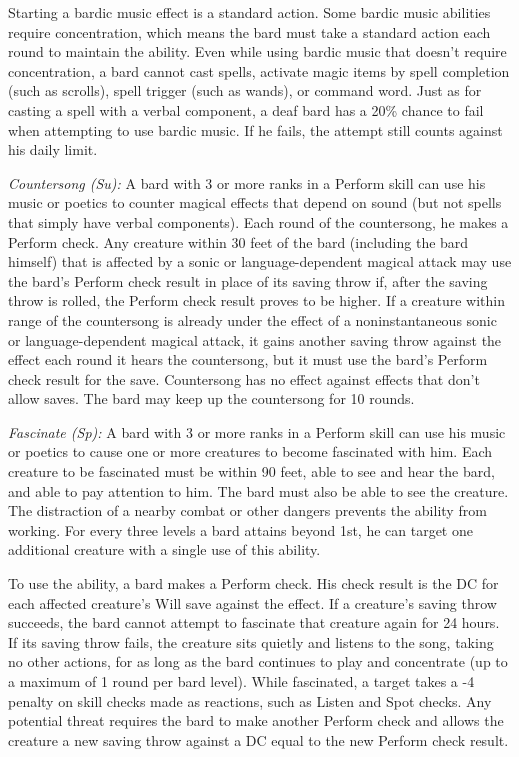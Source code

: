 \documentclass[10pt,a4paper,twocolumn]{d20}
\begin{document}
{Starting a bardic music effect is a standard action. Some bardic music abilities require concentration, which means the bard must take a standard action each round to maintain the ability. Even while using bardic music that doesn’t require concentration, a bard cannot cast spells, activate magic items by spell completion (such as scrolls), spell trigger (such as wands), or command word. Just as for casting a spell with a verbal component, a deaf bard has a 20\% chance to fail when attempting to use bardic music. If he fails, the attempt still counts against his daily limit.

\textit{Countersong (Su):} A bard with 3 or more ranks in a Perform skill can use his music or poetics to counter magical effects that depend on sound (but not spells that simply have verbal components). Each round of the countersong, he makes a Perform check. Any creature within 30 feet of the bard (including the bard himself) that is affected by a sonic or language-dependent magical attack may use the bard’s Perform check result in place of its saving throw if, after the saving throw is rolled, the Perform check result proves to be higher. If a creature within range of the countersong is already under the effect of a noninstantaneous sonic or language-dependent magical attack, it gains another saving throw against the effect each round it hears the countersong, but it must use the bard’s Perform check result for the save. Countersong has no effect against effects that don’t allow saves. The bard may keep up the countersong for 10 rounds.

\textit{Fascinate (Sp):} A bard with 3 or more ranks in a Perform skill can use his music or poetics to cause one or more creatures to become fascinated with him. Each creature to be fascinated must be within 90 feet, able to see and hear the bard, and able to pay attention to him. The bard must also be able to see the creature. The distraction of a nearby combat or other dangers prevents the ability from working. For every three levels a bard attains beyond 1st, he can target one additional creature with a single use of this ability.

To use the ability, a bard makes a Perform check. His check result is the DC for each affected creature’s Will save against the effect. If a creature’s saving throw succeeds, the bard cannot attempt to fascinate that creature again for 24 hours. If its saving throw fails, the creature sits quietly and listens to the song, taking no other actions, for as long as the bard continues to play and concentrate (up to a maximum of 1 round per bard level). While fascinated, a target takes a -4 penalty on skill checks made as reactions, such as Listen and Spot checks. Any potential threat requires the bard to make another Perform check and allows the creature a new saving throw against a DC equal to the new Perform check result.

}
\end{document}
